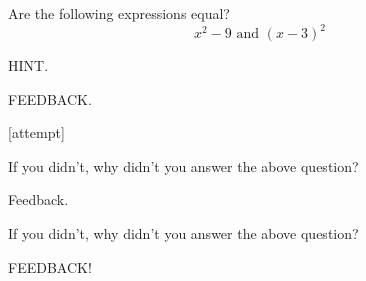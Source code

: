 \documentclass{ximera}
\begin{document}
\begin{problem} 
\begin{problem}
    Are the following expressions equal?
    $$x^2 - 9 \text{ and } (x-3)^2$$
    
    \begin{hint}
    HINT.
    \end{hint}
    
  \begin{multipleChoice}
      
        \begin{feedback}[attempt]
        FEEDBACK.
        \end{feedback}[attempt]
        
  \end{multipleChoice}

\end{problem}

\begin{question}
  
    If you didn't, why didn't you answer the above question?
  
  \begin{multipleChoice}
      
      \begin{feedback}[attempt]
      Feedback.
      \end{feedback}
      
  \end{multipleChoice}
  
\end{question}

\begin{question}

    If you didn't, why didn't you answer the above question?

    \begin{multipleChoice}
      
          \begin{feedback}[attempt]
          FEEDBACK!
          \end{feedback}
          
  \end{multipleChoice}
\end{question}
\end{problem}
\end{document}
